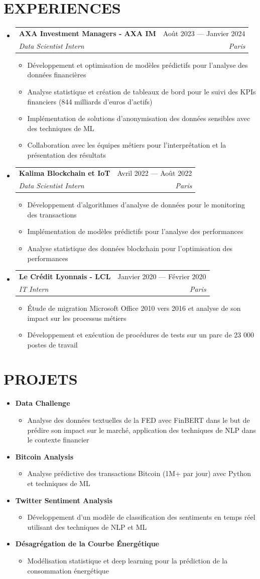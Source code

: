\documentclass[11pt,a4paper]{article}
\makeatletter
\newcommand{\resumeItem}[1]{
  \item\footnotesize{
    {#1 \vspace{-1pt}}
  }
}
\newcommand{\resumeSubheading}[4]{
  \vspace{2pt}\item
    \begin{tabular*}{\textwidth}[t]{l@{\extracolsep{\fill}}r}
      {\footnotesize\textbf{#1}} & {\footnotesize#2} \\
      {\footnotesize\textit{#3}} & {\footnotesize\textit{#4}} \\
    \end{tabular*}\vspace{2pt}
}
\newcommand{\resumeProjectHeading}[2]{
  \item
  {\footnotesize#1} \hfill {#2}
}
\newcommand{\resumeSubHeadingListStart}{\begin{itemize}[leftmargin=0in, label={}]}
\newcommand{\resumeSubHeadingListEnd}{\end{itemize}}
\newcommand{\resumeItemListStart}{\begin{itemize}[label={\textbullet}]}
\newcommand{\resumeItemListEnd}{\end{itemize}\vspace{0pt}}
\makeatother
\begin{document}
\section{EXPERIENCES}
\resumeSubHeadingListStart
    \resumeSubheading
      {AXA Investment Managers - AXA IM}{Août 2023 --- Janvier 2024}
      {Data Scientist Intern}{Paris}
      \resumeItemListStart
        \resumeItem{Développement et optimisation de modèles prédictifs pour l'analyse des données financières}
        \resumeItem{Analyse statistique et création de tableaux de bord pour le suivi des KPIs financiers (844 milliards d'euros d'actifs)}
        \resumeItem{Implémentation de solutions d'anonymisation des données sensibles avec des techniques de ML}
        \resumeItem{Collaboration avec les équipes métiers pour l'interprétation et la présentation des résultats}
      \resumeItemListEnd
    \resumeSubheading
      {Kalima Blockchain et IoT}{Avril 2022 --- Août 2022}
      {Data Scientist Intern}{Paris}
      \resumeItemListStart
        \resumeItem{Développement d'algorithmes d'analyse de données pour le monitoring des transactions}
        \resumeItem{Implémentation de modèles prédictifs pour l'analyse des performances}
        \resumeItem{Analyse statistique des données blockchain pour l'optimisation des performances}
      \resumeItemListEnd
    \resumeSubheading
      {Le Crédit Lyonnais - LCL}{Janvier 2020 --- Février 2020}
      {IT Intern}{Paris}
      \resumeItemListStart
        \resumeItem{Étude de migration Microsoft Office 2010 vers 2016 et analyse de son impact sur les processus métiers}
        \resumeItem{Développement et exécution de procédures de tests sur un parc de 23 000 postes de travail}
      \resumeItemListEnd
  \resumeSubHeadingListEnd

\section{PROJETS}
\resumeSubHeadingListStart
    \resumeProjectHeading
      {\textbf{Data Challenge \@Natixis}} {}
      \resumeItemListStart
        \resumeItem{Analyse des données textuelles de la FED avec FinBERT dans le but de prédire son impact sur le marché, application des techniques de NLP dans le contexte financier}
      \resumeItemListEnd
    \resumeProjectHeading
      {\textbf{Bitcoin Analysis}} {}
      \resumeItemListStart
        \resumeItem{Analyse prédictive des transactions Bitcoin (1M+ par jour) avec Python et techniques de ML}
      \resumeItemListEnd
    \resumeProjectHeading
      {\textbf{Twitter Sentiment Analysis}} {}
      \resumeItemListStart
        \resumeItem{Développement d'un modèle de classification des sentiments en temps réel utilisant des techniques de NLP et ML}
      \resumeItemListEnd
    \resumeProjectHeading
      {\textbf{Désagrégation de la Courbe Énergétique \@Capgemini}} {}
      \resumeItemListStart
        \resumeItem{Modélisation statistique et deep learning pour la prédiction de la consommation énergétique}
      \resumeItemListEnd
\resumeSubHeadingListEnd
\end{document}
